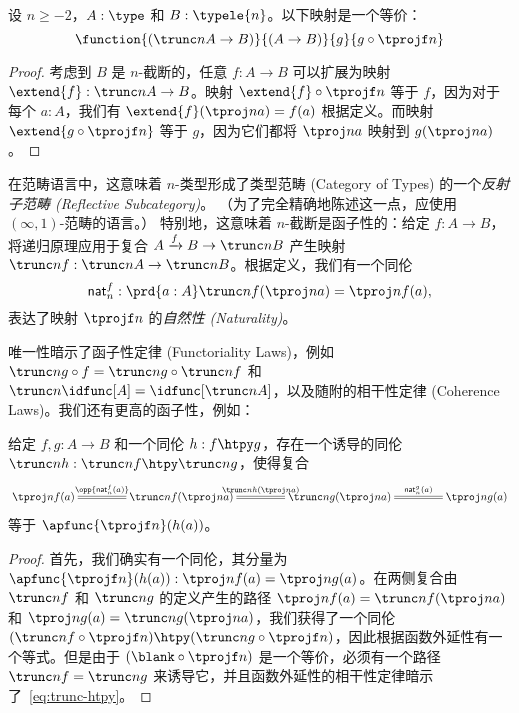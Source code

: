 \begin{lem}\label{thm:trunc-reflective}
%
设 $n\ge-2$，$A:\type$ 和 $B:\typele{n}$。以下映射是一个等价：
\[\function{(\trunc nA\to{}B)}{(A\to{}B)}{g}{g\circ\tprojf n}\]
\end{lem}

\begin{proof}
    考虑到 $B$ 是 $n$-截断的，任意 $f:A\to{}B$ 可以扩展为映射 $\extend{f}:\trunc nA\to{}B$。映射 $\extend{f}\circ\tprojf n$ 等于 $f$，因为对于每个 $a:A$，我们有 $\extend{f}(\tproj na)=f(a)$ 根据定义。而映射 $\extend{g\circ\tprojf n}$ 等于 $g$，因为它们都将 $\tproj na$ 映射到 $g(\tproj na)$。
\end{proof}

在范畴语言中，这意味着 $n$-类型形成了类型范畴 (Category of Types) 的一个\emph{反射子范畴 (Reflective Subcategory)}。%
（为了完全精确地陈述这一点，应使用 $(\infty,1)$-范畴的语言。）
%
特别地，这意味着 $n$-截断是函子性的：给定 $f:A\to B$，将递归原理应用于复合 $A\xrightarrow{f} B \to \trunc n B$ 产生映射 $\trunc n f: \trunc n A \to \trunc n B$。根据定义，我们有一个同伦
\begin{equation}
    \mathsf{nat}^f_n : \prd{a:A} \trunc n f(\tproj n a) = \tproj n {f(a)},\label{eq:trunc-nat}
\end{equation}
表达了映射 $\tprojf n$ 的\emph{自然性 (Naturality)}。

唯一性暗示了函子性定律 (Functoriality Laws)，例如 $\trunc n {g\circ f} = \trunc n g \circ \trunc n f$ 和 $\trunc n{\idfunc[A]} = \idfunc[\trunc n A]$，以及随附的相干性定律 (Coherence Laws)。我们还有更高的函子性，例如：

\begin{lem}\label{thm:trunc-htpy}
给定 $f,g:A\to B$ 和一个同伦 $h:f\htpy g$，存在一个诱导的同伦 $\trunc n h : \trunc n f \htpy \trunc n g$，使得复合
\begin{equation}
    \xymatrix@C=3.6pc{\tproj n{f(a)} \ar@{=}[r]^-{\opp{\mathsf{nat}^f_n(a)}} &
    \trunc n f(\tproj n a) \ar@{=}[r]^-{\trunc n h(\tproj na)} &
    \trunc n g(\tproj n a) \ar@{=}[r]^-{\mathsf{nat}^g_n(a)} &
    \tproj n{g(a)}}\label{eq:trunc-htpy}
\end{equation}
等于 $\apfunc{\tprojf n}(h(a))$。
\end{lem}
\begin{proof}
    首先，我们确实有一个同伦，其分量为 $\apfunc{\tprojf n}(h(a)) : \tproj n{f(a)} = \tproj n{g(a)}$。在两侧复合由 $\trunc n f$ 和 $\trunc ng$ 的定义产生的路径 $\tproj n{f(a)} = \trunc n f(\tproj n a)$ 和 $\tproj n{g(a)} = \trunc n g(\tproj n a)$，我们获得了一个同伦 $(\trunc n f \circ \tprojf n) \htpy (\trunc n g \circ \tprojf n)$，因此根据函数外延性有一个等式。但是由于 $(\blank\circ \tprojf n)$ 是一个等价，必须有一个路径 $\trunc nf = \trunc ng$ 来诱导它，并且函数外延性的相干性定律暗示了~\eqref{eq:trunc-htpy}。
\end{proof}


